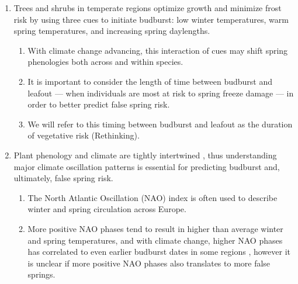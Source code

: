 \documentclass{article}\usepackage[]{graphicx}\usepackage[]{color}
\begin{document}
\begin{enumerate}
\item Trees and shrubs in temperate regions optimize growth and minimize frost risk by using three cues to initiate budburst: low winter temperatures, warm spring temperatures, and increasing spring daylengths.
\begin{enumerate}
 \item With climate change advancing, this interaction of cues may shift spring phenologies both across and within species.
 \item It is important to consider the length of time between budburst and leafout --- when individuals are most at risk to spring freeze damage \citep{Lenz2016} --- in order to better predict false spring risk.
 \item We will refer to this timing between budburst and leafout as the duration of vegetative risk (Rethinking).
\end{enumerate}

\item Plant phenology and climate are tightly intertwined \citep{Wolkovich2011}, thus understanding major climate oscillation patterns is essential for predicting budburst and, ultimately, false spring risk.  
\begin{enumerate}
\item The North Atlantic Oscillation (NAO) index is often used to describe winter and spring circulation across Europe. %
\item More positive NAO phases tend to result in higher than average winter and spring temperatures, and with climate change, higher NAO phases has correlated to even earlier budburst dates in some regions \citep{Chmielewski2001}, however it is unclear if more positive NAO phases also translates to more false springs.
\end{enumerate}


\end{enumerate}
\end{document}
